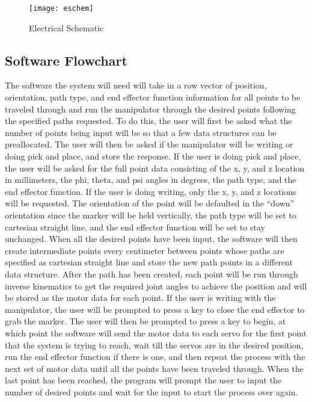 \begin{figure}[htp]
  \centering
  \texttt{[image: eschem]}
  \caption{Electrical Schematic}
  \label{fig:eschem}
\end{figure}

\subsection{Software Flowchart}
The software the system will need will take in a row vector of position, orientation, path type, and end effector function information for all points to be traveled through and run the manipulator through the desired points following the specified paths requested. To do this, the user will first be asked what the number of points being input will be so that a few data structures can be preallocated. The user will then be asked if the manipulator will be writing or doing pick and place, and store the response. If the user is doing pick and place, the user will be asked for the full point data consisting of the x, y, and z location in millimeters, the phi, theta, and psi angles in degrees, the path type, and the end effector function. If the user is doing writing, only the x, y, and z locations will be requested. The orientation of the point will be defaulted in the “down” orientation since the marker will be held vertically, the path type will be set to cartesian straight line, and the end effector function will be set to stay unchanged. When all the desired points have been input, the software will then create intermediate points every centimeter between points whose paths are specified as cartesian straight line and store the new path points in a different data structure. After the path has been created, each point will be run through inverse kinematics to get the required joint angles to achieve the position and will be stored as the motor data for each point. If the user is writing with the manipulator, the user will be prompted to press a key to close the end effector to grab the marker. The user will then be prompted to press a key to begin, at which point the software will send the motor data to each servo for the first point that the system is trying to reach, wait till the servos are in the desired position, run the end effector function if there is one, and then repeat the process with the next set of motor data until all the points have been traveled through. When the last point has been reached, the program will prompt the user to input the number of desired points and wait for the input to start the process over again.

